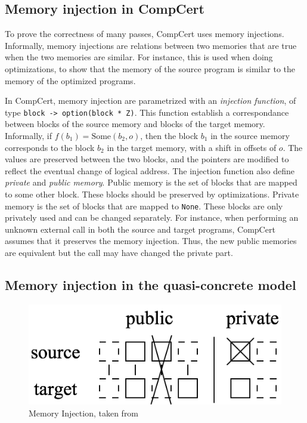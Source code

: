 \label{sec:meminj}
\subsection{Memory injection in CompCert}

To prove the correctness of many passes, CompCert uses memory injections. Informally, memory injections are relations between two memories that are true when the two memories are similar. For instance, this is used when doing optimizations, to show that the memory of the source program is similar to the memory of the optimized programs.

In CompCert, memory injection are parametrized with an \textit{injection function}, of type \texttt{block -> option(block * Z)}. This function establish a correspondance between blocks of the source memory and blocks of the target memory.
Informally, if $f(b_1)=\text{Some}(b_2,o)$, then the block $b_1$ in the source memory corresponds to the block $b_2$ in the target memory, with a shift in offsets of $o$. The values are preserved between the two blocks, and the pointers are modified to reflect the eventual change of logical address.
The injection function also define \textit{private} and \textit{public memory}. Public memory is the set of blocks that are mapped to some other block. These blocks should be preserved by optimizations.
Private memory is the set of blocks that are mapped to \texttt{None}. These blocks are only privately used and can be changed separately.
For instance, when performing an unknown external call in both the source and target programs, CompCert assumes that it preserves the memory injection. Thus, the new public memories are equivalent but the call may have changed the private part.

\subsection{Memory injection in the quasi-concrete model}

\begin{figure}
\includegraphics[scale=0.35]{img/meminj.png}
\caption{Memory Injection, taken from~\cite{DBLP:conf/pldi/KangHMGZV15}}
\label{fig:meminj}
\end{figure}


